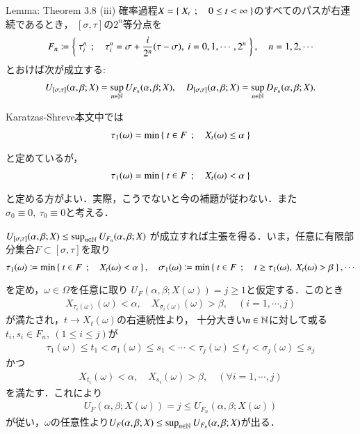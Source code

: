 	\begin{itembox}[l]{Lemma: Theorem 3.8 (iii)}
		確率過程$X = \left\{\ X_t\ \, ; \quad 0 \leq t < \infty\ \right\}$のすべてのパスが右連続であるとき，
		$[\sigma,\tau]$の$2^n$等分点を
		\begin{align}
			F_n \coloneqq \left\{\ \tau_i^n\ \, ; \quad \tau_i^n = \sigma + \frac{i}{2^n}(\tau - \sigma),\ i=0,1,\cdots,2^n\ \right\},
			\quad n=1,2,\cdots
		\end{align}
		とおけば次が成立する:
		\begin{align}
			U_{[\sigma,\tau]}(\alpha,\beta;X)
			= \operatorname*{sup}_{n \in \mathbb{N}} U_{F_n}(\alpha,\beta;X),
			\quad D_{[\sigma,\tau]}(\alpha,\beta;X)
			= \operatorname*{sup}_{n \in \mathbb{N}} D_{F_n}(\alpha,\beta;X).
		\end{align}
	\end{itembox}
	Karatzas-Shreve本文中では
	\begin{align}
		\tau_1(\omega) = \operatorname*{min}_{} \left\{\ t \in F\ \, ; \quad X_t(\omega) \leq \alpha\ \right\}
	\end{align}
	と定めているが，
	\begin{align}
		\tau_1(\omega) = \operatorname*{min}_{} \left\{\ t \in F\ \, ; \quad X_t(\omega) < \alpha\ \right\}
	\end{align}
	と定める方がよい．実際，こうでないと今の補題が従わない．また$\sigma_0 \equiv 0,\ \tau_0 \equiv 0$と考える．
	\begin{prf}
		$U_{[\sigma,\tau]}(\alpha,\beta;X) \leq \operatorname*{sup}_{n \in \mathbb{N}} U_{F_n}(\alpha,\beta;X)$
		が成立すれば主張を得る．いま，任意に有限部分集合$F \subset [\sigma,\tau]$を取り
		\begin{align}
			\tau_1(\omega) \coloneqq \operatorname*{min}_{} \left\{\ t \in F\ \, ; \quad X_t(\omega) < \alpha\ \right\},
			\quad \sigma_1(\omega) \coloneqq \operatorname*{min}_{} \left\{\ t \in F\ \, ; \quad t \geq \tau_1(\omega),\ X_t(\omega) > \beta\ \right\},
			\cdots
		\end{align}
		を定め，$\omega \in \Omega$を任意に取り
		$U_F(\alpha,\beta;X(\omega)) = j \geq 1$と仮定する．このとき
		\begin{align}
			X_{\tau_i(\omega)}(\omega) < \alpha,
			\quad X_{\sigma_i(\omega)}(\omega) > \beta,
			\quad (i=1,\cdots,j)
		\end{align}
		が満たされ，$t \longrightarrow X_t(\omega)$の右連続性より，
		十分大きい$n \in \mathbb{N}$に対して或る$t_i,s_i \in F_n,\ (1 \leq i \leq j)$が
		\begin{align}
			\tau_1(\omega) \leq t_1 < \sigma_1(\omega) \leq s_1 < 
			\cdots < \tau_j(\omega) \leq t_j < \sigma_j(\omega) \leq s_j
		\end{align}
		かつ
		\begin{align}
			X_{t_i}(\omega) < \alpha,
			\quad X_{s_i}(\omega) > \beta,
			\quad (\forall i=1,\cdots,j)
		\end{align}
		を満たす．これにより
		\begin{align}
			U_F(\alpha,\beta;X(\omega)) = j \leq U_{F_n}(\alpha,\beta;X(\omega))
		\end{align}
		が従い，$\omega$の任意性より$U_F(\alpha,\beta;X) \leq \operatorname*{sup}_{n \in \mathbb{N}} U_{F_n}(\alpha,\beta;X)$が出る．
		\QED
	\end{prf}
	

